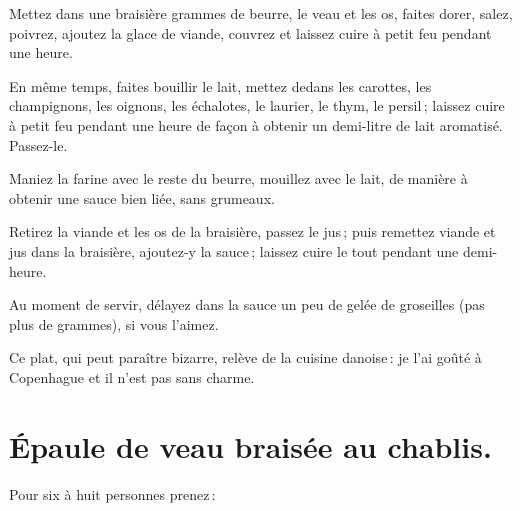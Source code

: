 Mettez dans une braisière {\mmm} grammes de beurre, le veau et les os, faites
dorer, salez, poivrez, ajoutez la glace de viande, couvrez et laissez cuire
à petit feu pendant une heure.

En même temps, faites bouillir le lait, mettez dedans les carottes, les
champignons, les oignons, les échalotes, le laurier, le thym, le persil ;
laissez cuire à petit feu pendant une heure de façon à obtenir un demi-litre de
lait aromatisé. Passez-le.

Maniez la farine avec le reste du beurre, mouillez avec le lait, de manière
à obtenir une sauce bien liée, sans grumeaux.

Retirez la viande et les os de la braisière, passez le jus ; puis remettez
viande et jus dans la braisière, ajoutez-y la sauce ; laissez cuire le tout
pendant une demi-heure.

Au moment de servir, délayez dans la sauce un peu de gelée de groseilles (pas
plus de {\mmm} grammes), si vous l’aimez.

Ce plat, qui peut paraître bizarre, relève de la cuisine danoise : je l'ai
goûté à Copenhague et il n'est pas sans charme.

\section*{\centering Épaule de veau braisée au chablis.}
{}

Pour six à huit personnes prenez :

\medskip

